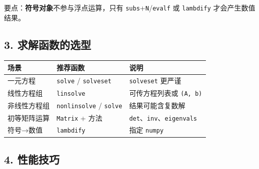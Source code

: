 要点：\textbf{符号对象}不参与浮点运算，只有
\texttt{subs}+\texttt{N}/\texttt{evalf} 或 \texttt{lambdify}
才会产生数值结果。

\subsection{3.
求解函数的选型}\label{ux6c42ux89e3ux51fdux6570ux7684ux9009ux578b}

{\def\LTcaptype{none} %
\begin{longtable}[]{@{}lll@{}}
\toprule\noalign{}
场景 & 推荐函数 & 说明 \\
\midrule\noalign{}
\endhead
\bottomrule\noalign{}
\endlastfoot
一元方程 & \texttt{solve} / \texttt{solveset} & \texttt{solveset}
更严谨 \\
线性方程组 & \texttt{linsolve} & 可传方程列表或 \texttt{(A,\ b)} \\
非线性方程组 & \texttt{nonlinsolve} / \texttt{solve} &
结果可能含复数解 \\
初等矩阵运算 & \texttt{Matrix} + 方法 &
\texttt{det}、\texttt{inv}、\texttt{eigenvals} \\
符号→数值 & \texttt{lambdify} & 指定
\texttt{\textquotesingle{}numpy\textquotesingle{}} \\
\end{longtable}
}

\subsection{4. 性能技巧}\label{ux6027ux80fdux6280ux5de7-1}

